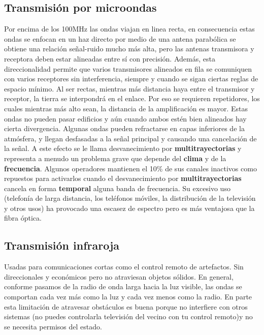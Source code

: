 \documentclass[
	12pt, %
	fleqn, %
	a4paper, %
	oneside, %
]{LegrandOrangeBook}
\begin{document}
\subsection{Transmisión por microondas}
Por encima de los 100MHz las ondas viajan en linea recta, en consecuencia estas ondas se enfocan en un haz directo por medio de una antena parabólica se obtiene una relación señal-ruido mucho más alta, pero las antenas transmisora y receptora deben estar alineadas entre sí con precisión. Además, esta direccionalidad permite que varios transmisores alineados en fila se comuniquen con varios receptores sin interferencia, siempre y cuando se sigan ciertas reglas de espacio mínimo. Al ser rectas, mientras más distancia haya entre el transmisor y receptor, la tierra se interpondrá en el enlace. Por eso se requieren repetidores, los cuales mientras más alto sean, la distancia de la amplificación es mayor. Estas ondas no pueden pasar edificios y aún cuando ambos estén bien alineados hay cierta divergencia. Algunas ondas pueden refractarse en capas inferiores de la atmósfera, y llegan desfasadas a la señal principal y causando una cancelación de la señal. A este efecto se le llama desvanecimiento por \textbf{multitrayectorias} y representa a menudo un problema grave que depende del \textbf{clima} y de la \textbf{frecuencia}. Algunos operadores mantienen el 10\% de sus canales inactivos como repuestos para activarlos cuando el desvanecimiento por \textbf{multitrayectorias} cancela en forma \textbf{temporal} alguna banda de frecuencia. Su excesivo uso (telefonía de larga distancia, los teléfonos móviles, la distribución de la televisión y otros usos) ha provocado una escasez de espectro pero es más ventajosa que la fibra óptica.
\subsection{Transmisión infraroja}
Usadas para comunicaciones cortas como el control remoto de artefactos. Sin direccionales y económicos pero no atraviesan objetos sólidos. En general, conforme pasamos de la radio de onda larga hacia la luz visible, las ondas se comportan cada vez más como la luz y cada vez menos como la radio. En parte esta limitación de atravesar obstáculos es buena porque no interfiere con otros sistemas (no puedes controlarla televisión del vecino con tu control remoto)y no se necesita permisos del estado.
\end{document}
